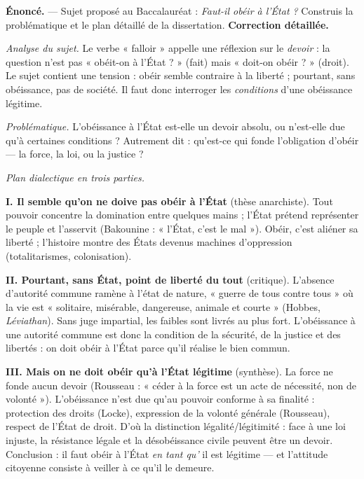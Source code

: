 \documentclass[11pt]{article}
\begin{document}
\begin{exoresolu}
\textbf{Énoncé.} — Sujet proposé au Baccalauréat : \emph{Faut-il obéir à l'État ?} Construis la problématique et le plan détaillé de la dissertation.
\tcblower
\textbf{Correction détaillée.}

\emph{Analyse du sujet.} Le verbe « falloir » appelle une réflexion sur le \emph{devoir} : la question n'est pas « obéit-on à l'État ? » (fait) mais « doit-on obéir ? » (droit). Le sujet contient une tension : obéir semble contraire à la liberté ; pourtant, sans obéissance, pas de société. Il faut donc interroger les \emph{conditions} d'une obéissance légitime.

\emph{Problématique.} L'obéissance à l'État est-elle un devoir absolu, ou n'est-elle due qu'à certaines conditions ? Autrement dit : qu'est-ce qui fonde l'obligation d'obéir — la force, la loi, ou la justice ?

\emph{Plan dialectique en trois parties.}

\textbf{I. Il semble qu'on ne doive pas obéir à l'État} (thèse anarchiste). Tout pouvoir concentre la domination entre quelques mains ; l'État prétend représenter le peuple et l'asservit (Bakounine : « l'État, c'est le mal »). Obéir, c'est aliéner sa liberté ; l'histoire montre des États devenus machines d'oppression (totalitarismes, colonisation).

\textbf{II. Pourtant, sans État, point de liberté du tout} (critique). L'absence d'autorité commune ramène à l'état de nature, « guerre de tous contre tous » où la vie est « solitaire, misérable, dangereuse, animale et courte » (Hobbes, \emph{Léviathan}). Sans juge impartial, les faibles sont livrés au plus fort. L'obéissance à une autorité commune est donc la condition de la sécurité, de la justice et des libertés : on doit obéir à l'État parce qu'il réalise le bien commun.

\textbf{III. Mais on ne doit obéir qu'à l'État légitime} (synthèse). La force ne fonde aucun devoir (Rousseau : « céder à la force est un acte de nécessité, non de volonté »). L'obéissance n'est due qu'au pouvoir conforme à sa finalité : protection des droits (Locke), expression de la volonté générale (Rousseau), respect de l'État de droit. D'où la distinction légalité/légitimité : face à une loi injuste, la résistance légale et la désobéissance civile peuvent être un devoir. Conclusion : il faut obéir à l'État \emph{en tant qu'} il est légitime — et l'attitude citoyenne consiste à veiller à ce qu'il le demeure.
\end{exoresolu}
\end{document}
